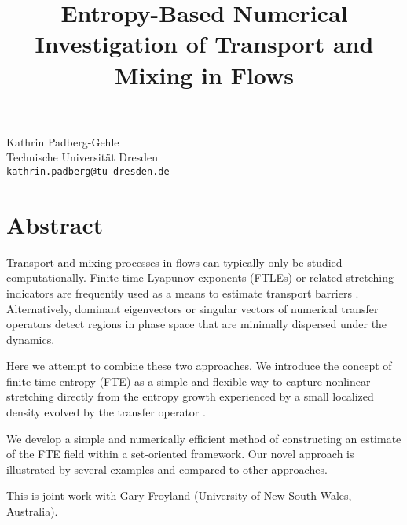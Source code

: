 \title{Entropy-Based Numerical Investigation of Transport and Mixing in Flows}
 \author{} \institute{}
\maketitle
\begin{center}
{\large Kathrin Padberg-Gehle}\\
Technische Universit\"at Dresden\\
{\tt kathrin.padberg@tu-dresden.de}

\end{center}

\section*{Abstract}

Transport and mixing processes in flows can typically only be studied computationally. Finite-time Lyapunov exponents (FTLEs) or related stretching indicators are frequently used as a means to estimate transport barriers \cite{haller_11,shadden_lekien_marsden_05}.  Alternatively, dominant eigenvectors \cite{dellnitz_junge_99} or singular vectors \cite{froyland_santi_monahan_10} of numerical transfer operators detect regions in phase space that are minimally dispersed under the dynamics.
 
Here we attempt to combine these two approaches. We introduce the concept of finite-time entropy (FTE) as a simple and flexible way to capture nonlinear stretching directly from the entropy growth experienced by a small localized density evolved by the transfer operator \cite{froyland_padberg_2012}.

We develop a simple and numerically efficient method of constructing an estimate of the FTE field within a set-oriented framework. Our novel approach is illustrated by several examples and compared to other approaches. 

This is joint work with Gary Froyland (University of New South Wales, Australia).


